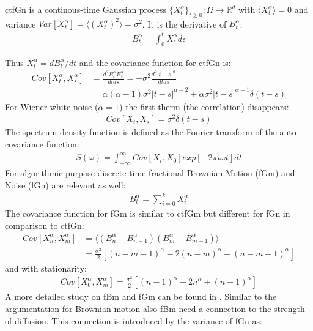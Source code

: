 \documentclass[
  a4paper,BCOR10mm,oneside,
  bibtotoc,idxtotoc,
  headsepline,footsepline,%
  fleqn,openbib
]{scrbook}
\begin{document}
\begin{mydef}
ctfGn is a continous-time Gaussian process $\{X^{\alpha}_t\}_{t\geq0}: \Omega \rightarrow \mathbb{R}^d$ with $\langle X^{\alpha}_t \rangle=0$ and variance $Var[X^{\alpha}_t]= \langle (X^{\alpha}_t)^2 \rangle=\sigma^2$. It is the derivative of $B^{\alpha}_t$:
\begin{align}
  B^{\alpha}_t=\int^t_0 X^{\alpha}_{\epsilon} d \epsilon
\end{align}
\end{mydef}
Thus $X^{\alpha}_t=d B^{\alpha}_t/dt$ and the covariance function for ctfGn is:
\begin{align}
 Cov[X^{\alpha}_t,X^{\alpha}_s]&= \frac{d^2 B^{\alpha}_t B^{\alpha}_s}{dt ds}=-\sigma^2 \frac{d^2 |t-s|^{\alpha}}{dtds}\\
 &=\alpha (\alpha-1) \sigma^2 |t-s|^{\alpha-2}+\alpha \sigma^2 |t-s|^{\alpha-1} \delta(t-s)
\end{align}
For Wiener white noise ($\alpha=1$) the first therm (the correlation) disappears:
\begin{align}
 Cov[X_t,X_s]= \sigma^2 \delta(t-s)
\end{align}
The spectrum density function is defined as the Fourier transform of the auto-covariance function:
\begin{align}
 S(\omega)= \int^{\infty}_{-\infty} Cov[X_t,X_0] exp[-2 \pi i \omega t] dt
\end{align}
For algorithmic purpose discrete time fractional Brownian Motion  (fGm) and Noise (fGn) are relevant as well:
\begin{align}
B^{\alpha}_{t}= \sum_{i=0}^kX^{\alpha}_i
\end{align}
The covariance function for fGm is similar to ctfGm but different for fGn in comparison to ctfGn:
\begin{align*}
 Cov[X^{\alpha}_n,X^{\alpha}_m]&=\langle (B^{\alpha}_n-B^{\alpha}_{n-1}) (B^{\alpha}_m-B^{\alpha}_{m-1})\rangle \\ &=\frac{\sigma^2}{2}[(n-m-1)^{\alpha}-2(n-m)^{\alpha}+(n-m+1)^{\alpha}]
\end{align*}
and with stationarity:
\begin{align}
 Cov[X^{\alpha}_0,X^{\alpha}_m]=\frac{\sigma^2}{2}[(n-1)^{\alpha}-2n^{\alpha}+(n+1)^{\alpha}]
\end{align}
A more detailed study on fBm and fGm can be found in \cite{qian2003fractional}. Similar to the argumentation for Brownian motion also fBm need a connection to the strength of diffusion. This connection is introduced by the variance of fGn as: 
\end{document}
